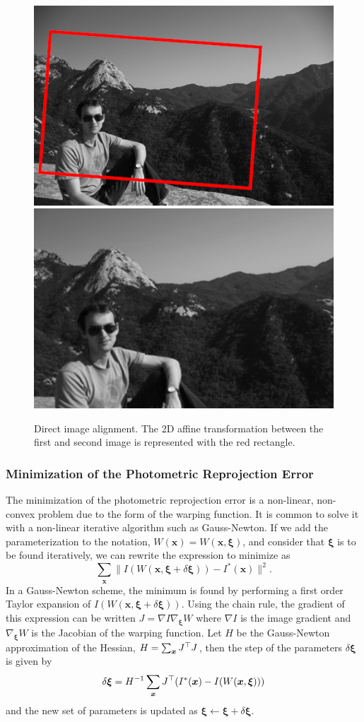 \begin{figure}[h]
	\centering
	\includegraphics[width=0.48\linewidth]{assets/img/image-alignment-1.png}
	\hfill
	\includegraphics[width=0.48\linewidth]{assets/img/image-alignment-2.png}
	\caption{Direct image alignment. The 2D affine transformation between the first
	and second image is represented with the red rectangle.}%
	\label{fig:direct-image-alignment}
\end{figure}

\subsubsection{Minimization of the Photometric Reprojection Error}%
\label{ssub:minimization_photometric_error}

The minimization of the photometric reprojection error is a non-linear,
non-convex problem due to the form of the warping function.
It is common to solve it with a non-linear iterative algorithm such as Gauss-Newton.
If we add the parameterization to the notation, $W(\bm{x}) = W(\bm{x}, \bm{\xi})$,
and consider that $\bm{\xi}$ is to be found iteratively,
we can rewrite the expression to minimize as
\[
	\sum_{\bm{x}}\|I(W(\bm{x}, \bm{\xi} + \delta \bm{\xi})) - I^{*}(\bm{x})\|^2.
\]
In a Gauss-Newton scheme, the minimum is found by performing a first order
Taylor expansion of $I(W(\bm{x}, \bm{\xi} + \delta \bm{\xi}))$.
Using the chain rule, the gradient of this expression can be written
$J = \nabla I \nabla_{\bm{\xi}}W$ where $\nabla I$ is the image gradient
and $\nabla_{\bm{\xi}}W$ is the Jacobian of the warping function.
Let $H$ be the Gauss-Newton approximation of the Hessian,
$H = \sum_{\bm{x}}J^{\top}J$,
then the step of the parameters $\delta \bm{\xi}$ is given by
\[
	\delta \bm{\xi} = H^{-1} \sum_{\bm{x}} J^{\top} (I^{*}(\bm{x}) - I(W(\bm{x}, \bm{\xi})))
\]
and the new set of parameters is updated as $\bm{\xi} \leftarrow \bm{\xi} + \delta \bm{\xi}$.

